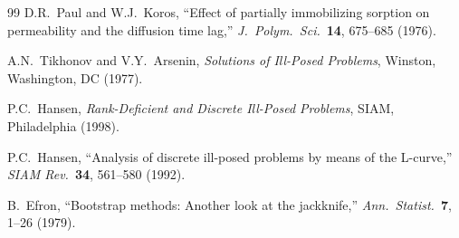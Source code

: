 \documentclass[12pt]{article}
\begin{document}
\begin{thebibliography}{99}
D.R.~Paul and W.J.~Koros,
``Effect of partially immobilizing sorption on permeability and the
diffusion time lag,''
\textit{J.\ Polym.\ Sci.}\ \textbf{14}, 675--685 (1976).

A.N.~Tikhonov and V.Y.~Arsenin,
\textit{Solutions of Ill-Posed Problems},
Winston, Washington, DC (1977).

P.C.~Hansen,
\textit{Rank-Deficient and Discrete Ill-Posed Problems},
SIAM, Philadelphia (1998).

P.C.~Hansen,
``Analysis of discrete ill-posed problems by means of the L-curve,''
\textit{SIAM Rev.}\ \textbf{34}, 561--580 (1992).

B.~Efron,
``Bootstrap methods: Another look at the jackknife,''
\textit{Ann.\ Statist.}\ \textbf{7}, 1--26 (1979).

\end{thebibliography}
\end{document}
